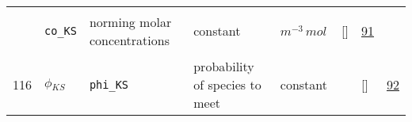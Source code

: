 \begin{longtable}{|p{1cm}|p{3cm}|p{3cm}|p{7cm}|p{3.0cm}|p{3cm}|p{2cm}|p{1cm}|}
             & \verb|co_KS|
             & norming molar concentrations
             & \begin{lay}constant \end{lay}
             & $ m^{-3} \,mol \, $
             & []
             & \hyperlink{"e:91"}{ 91 }
                 \\
    116
             & \hypertarget{"v:116"}{ $ {\phi}{_{{K S}}} $}
             & \verb|phi_KS|
             & probability of species to meet
             & \begin{lay}constant \end{lay}
             & $  $
             & []
             & \hyperlink{"e:92"}{ 92 }
                 \\
    \end{longtable}